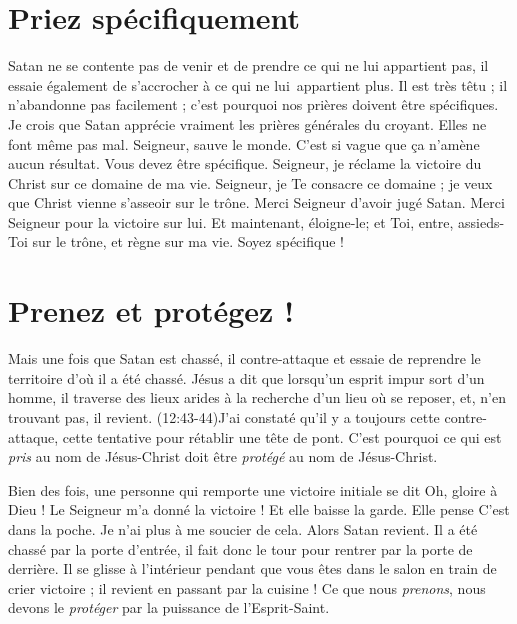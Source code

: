 \section{Priez sp\'ecifiquement}

Satan ne se contente pas de venir et de prendre ce qui ne lui appartient pas,
 il essaie également de s'accrocher à ce qui ne lui~appartient %
 plus.  Il est très têtu ; il n'abandonne pas facilement ;
 c'est pourquoi nos prières doivent être spécifiques.
 Je crois que Satan apprécie vraiment les prières générales du croyant.
 Elles ne font même pas mal. \Og Seigneur, sauve le monde. \Fg{}
 C'est si vague que ça n'amène aucun résultat.
 Vous devez être spécifique. \Og Seigneur, je réclame la victoire du Christ
 sur ce domaine de ma vie. Seigneur, je Te consacre ce domaine ;
 je veux que Christ vienne s'asseoir sur le trône.
 Merci Seigneur d'avoir jugé Satan.
 Merci Seigneur pour la victoire sur lui.
 Et maintenant, éloigne-le;
 et Toi, entre, assieds-Toi sur le trône,
 et règne sur ma vie. \Fg{} Soyez spécifique !


\section{Prenez et prot\'egez !}

Mais une fois que Satan est chassé, il contre-attaque et essaie de reprendre
 le territoire d'où il a été chassé.
 Jésus a dit que lorsqu'un esprit impur sort d'un homme,
 il traverse des lieux arides à la recherche d'un lieu où se reposer,
 et, n'en trouvant pas, il revient.
 (12:43-44)J'ai constaté qu'il y a toujours cette contre-attaque,
 cette tentative pour rétablir une tête de pont.
 C'est pourquoi ce qui est \emph{pris}
 au nom de Jésus-Christ doit être
 \emph{protégé} au nom de Jésus-Christ.

Bien des fois, une personne qui remporte une victoire initiale se dit\frcolon{}
 \Og Oh, gloire à Dieu ! Le Seigneur m'a donné la victoire ! \Fg{}
 Et elle baisse la garde. Elle pense\frcolon{} \Og C'est dans la poche.
 Je n'ai plus à me soucier de cela. \Fg{} Alors Satan revient.
 Il a été chassé par la porte d'entrée, il fait donc le tour
 pour rentrer par la porte de derrière.
 Il se glisse à l'intérieur pendant que vous êtes dans le salon
 en train de crier victoire ; il revient en passant par la cuisine !
 Ce que nous \emph{prenons}, nous devons le \emph{protéger}
 par la puissance de l'Esprit-Saint.
\closechapter


